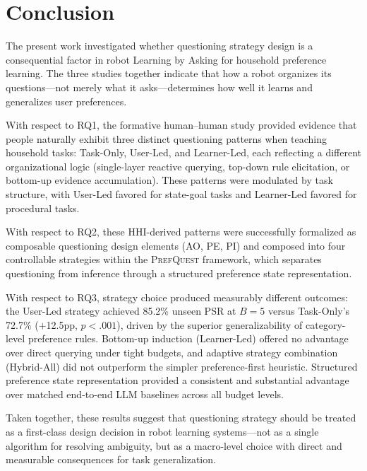 \documentclass[manuscript,review,anonymous]{acmart}
\newcommand{\revstart}{\color{revcolor}}  %
\newcommand{\revend}{\color{black}}       %
\renewcommand{\revstart}{}
\renewcommand{\revend}{}
\begin{document}
\section{Conclusion}
\label{sec:conclusion}
{\revstart

The present work investigated whether questioning strategy design is a consequential factor in robot Learning by Asking for household preference learning. The three studies together indicate that how a robot organizes its questions---not merely what it asks---determines how well it learns and generalizes user preferences.

With respect to RQ1, the formative human--human study provided evidence that people naturally exhibit three distinct questioning patterns when teaching household tasks: Task-Only, User-Led, and Learner-Led, each reflecting a different organizational logic (single-layer reactive querying, top-down rule elicitation, or bottom-up evidence accumulation). These patterns were modulated by task structure, with User-Led favored for state-goal tasks and Learner-Led favored for procedural tasks.

With respect to RQ2, these HHI-derived patterns were successfully formalized as composable questioning design elements (AO, PE, PI) and composed into four controllable strategies within the \textsc{PrefQuest} framework, which separates questioning from inference through a structured preference state representation.

With respect to RQ3, strategy choice produced measurably different outcomes: the User-Led strategy achieved 85.2\% unseen PSR at $B=5$ versus Task-Only's 72.7\% ($+$12.5pp, $p < .001$), driven by the superior generalizability of category-level preference rules. Bottom-up induction (Learner-Led) offered no advantage over direct querying under tight budgets, and adaptive strategy combination (Hybrid-All) did not outperform the simpler preference-first heuristic. Structured preference state representation provided a consistent and substantial advantage over matched end-to-end LLM baselines across all budget levels.

Taken together, these results suggest that questioning strategy should be treated as a first-class design decision in robot learning systems---not as a single algorithm for resolving ambiguity, but as a macro-level choice with direct and measurable consequences for task generalization.
\revend}
\end{document}
